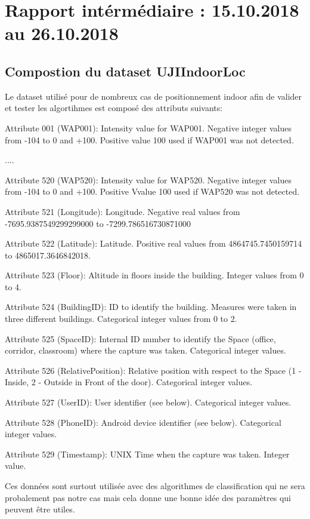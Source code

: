 \chapter{Rapport intérmédiaire : 15.10.2018 au 26.10.2018}

\section{Compostion du dataset UJIIndoorLoc}

Le dataset utilisé pour de nombreux cas de positionnement indoor afin de valider et tester les algortihmes est composé des attributs suivants: 

Attribute 001 (WAP001): Intensity value for WAP001. Negative integer values from -104 to 0 and +100. Positive value 100 used if WAP001 was not detected.

....

Attribute 520 (WAP520): Intensity value for WAP520. Negative integer values from -104 to 0 and +100. Positive Vvalue 100 used if WAP520 was not detected.

Attribute 521 (Longitude): Longitude. Negative real values from -7695.9387549299299000 to -7299.786516730871000

Attribute 522 (Latitude): Latitude. Positive real values from 4864745.7450159714 to 4865017.3646842018.

Attribute 523 (Floor): Altitude in floors inside the building. Integer values from 0 to 4.

Attribute 524 (BuildingID): ID to identify the building. Measures were taken in three different buildings. Categorical integer values from 0 to 2.

Attribute 525 (SpaceID): Internal ID number to identify the Space (office, corridor, classroom) where the capture was taken. Categorical integer values.

Attribute 526 (RelativePosition): Relative position with respect to the Space (1 - Inside, 2 - Outside in Front of the door). Categorical integer values.

Attribute 527 (UserID): User identifier (see below). Categorical integer values.

Attribute 528 (PhoneID): Android device identifier (see below). Categorical integer values.

Attribute 529 (Timestamp): UNIX Time when the capture was taken. Integer value. 

Ces données sont surtout utilisée avec des algorithmes de classification qui ne sera probalement pas notre cas mais cela donne une bonne idée des paramètres qui peuvent être utiles.

